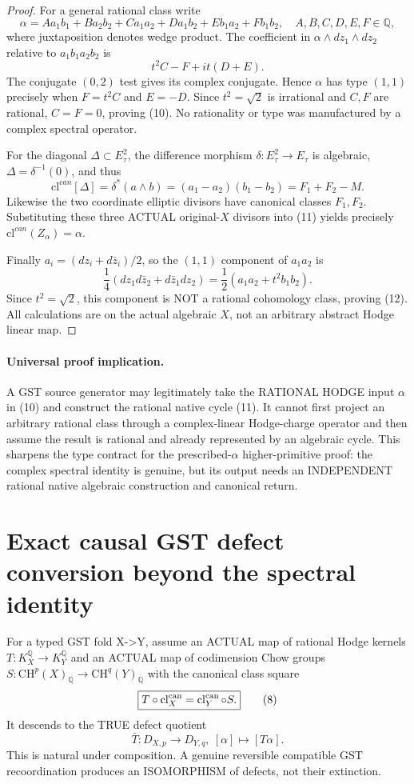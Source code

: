 \documentclass[11pt]{article}
\newcommand{\QQ}{\mathbb Q}
\newcommand{\CH}{\mathrm{CH}}
\newcommand{\cl}{\operatorname{cl}}
\begin{document}
\begin{proof}
For a general rational class write
\[
 \alpha=A a_1b_1+B a_2b_2+C a_1a_2
       +D a_1b_2+E b_1a_2+F b_1b_2,
 \quad A,B,C,D,E,F\in\QQ,
\]
where juxtaposition denotes wedge product.
The coefficient in
$\alpha\wedge dz_1\wedge dz_2$ relative to
$a_1b_1a_2b_2$ is
\[
             t^2 C-F+it(D+E).
\]
The conjugate $(0,2)$ test gives its complex
conjugate. Hence $\alpha$ has type $(1,1)$
precisely when $F=t^2 C$ and $E=-D$.
Since $t^2=\sqrt2$ is irrational and $C,F$
are rational, $C=F=0$, proving (10).
No rationality or type was manufactured by a
complex spectral operator.

For the diagonal $\Delta\subset E_\tau^2$,
the difference morphism
$\delta:E_\tau^2\to E_\tau$ is algebraic,
$\Delta=\delta^{-1}(0)$, and thus
\[
 \mathrm{cl}^{can}[\Delta]
 =\delta^*(a\wedge b)
 =(a_1-a_2)(b_1-b_2)
 =F_1+F_2-M .
\]
Likewise the two coordinate elliptic divisors
have canonical classes $F_1,F_2$.
Substituting these three ACTUAL original-$X$
divisors into (11) yields precisely
$\mathrm{cl}^{can}(Z_\alpha)=\alpha$.

Finally $a_i=(dz_i+d\bar z_i)/2$, so the
$(1,1)$ component of $a_1a_2$ is
\[
 \frac14(dz_1d\bar z_2+d\bar z_1dz_2)
 =\frac12(a_1a_2+t^2b_1b_2).
\]
Since $t^2=\sqrt2$, this component is NOT a
rational cohomology class, proving (12).
All calculations are on the actual algebraic
$X$, not an arbitrary abstract Hodge linear map.
\end{proof}

\paragraph{Universal proof implication.}
A GST source generator may legitimately take the
RATIONAL HODGE input $\alpha$ in (10) and construct
the rational native cycle (11). It cannot first
project an arbitrary rational class through a
complex-linear Hodge-charge operator and then assume
the result is rational and already represented by
an algebraic cycle. This sharpens the type contract
for the prescribed-$\alpha$ higher-primitive proof:
the complex spectral identity is genuine, but
its output needs an INDEPENDENT rational native
algebraic construction and canonical return.

\section{Exact causal GST defect conversion beyond the spectral identity}
For a typed GST fold X->Y, assume an ACTUAL
map of rational Hodge kernels \(T:K^\QQ_X\to K^\QQ_Y\)
and an ACTUAL map of codimension Chow groups
\(S:\CH^p(X)_\QQ\to\CH^q(Y)_\QQ\)
with the canonical class square
\[
 \boxed{T\circ\cl_X^{\rm can}
                  =\cl_Y^{\rm can}\circ S.}       \tag{8}
\]
It descends to the TRUE defect quotient
\[
 \boxed{\bar T:D_{X,p}\to D_{Y,q},\
                   [\alpha]\mapsto[T\alpha].}    \tag{9}
\]
This is natural under composition. A genuine
reversible compatible GST recoordination produces
an ISOMORPHISM of defects, not their extinction.
\end{document}
